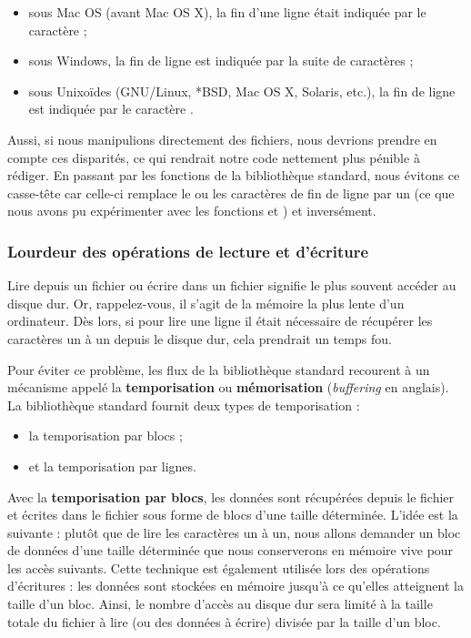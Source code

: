 \begin{itemize}
\item
  sous Mac OS (avant Mac OS X), la fin d'une ligne était indiquée par le
  caractère  ;
\item
  sous Windows, la fin de ligne est indiquée par la suite de caractères
   ;
\item
  sous Unixoïdes (GNU/Linux, *BSD, Mac OS X, Solaris, etc.), la fin de
  ligne est indiquée par le caractère .
\end{itemize}

Aussi, si nous manipulions directement des fichiers, nous devrions
prendre en compte ces disparités, ce qui rendrait notre code nettement
plus pénible à rédiger. En passant par les fonctions de la bibliothèque
standard, nous évitons ce casse-tête car celle-ci remplace le ou les
caractères de fin de ligne par un  (ce que
nous avons pu expérimenter avec les fonctions  et
) et inversément.

\subsubsection{Lourdeur des opérations de lecture et d'écriture}
\label{lourdeur-des-operations-de-lecture-et-decriture}

Lire depuis un fichier ou écrire dans un fichier signifie le plus
souvent accéder au disque dur. Or, rappelez-vous, il s'agit de la
mémoire la plus lente d'un ordinateur. Dès lors, si pour lire une ligne
il était nécessaire de récupérer les caractères un à un depuis le disque
dur, cela prendrait un temps fou.

Pour éviter ce problème, les flux de la bibliothèque standard recourent
à un mécanisme appelé la \textbf{temporisation} ou \textbf{mémorisation}
(\emph{buffering} en anglais). La bibliothèque standard fournit deux
types de temporisation :

\begin{itemize}
\item
  la temporisation par blocs ;
\item
  et la temporisation par lignes.
\end{itemize}

Avec la \textbf{temporisation par blocs}, les données sont récupérées
depuis le fichier et écrites dans le fichier sous forme de blocs d'une
taille déterminée. L'idée est la suivante : plutôt que de lire les
caractères un à un, nous allons demander un bloc de données d'une taille
déterminée que nous conserverons en mémoire vive pour les accès
suivants. Cette technique est également utilisée lors des opérations
d'écritures : les données sont stockées en mémoire jusqu'à ce qu'elles
atteignent la taille d'un bloc. Ainsi, le nombre d'accès au disque dur
sera limité à la taille totale du fichier à lire (ou des données à
écrire) divisée par la taille d'un bloc.

